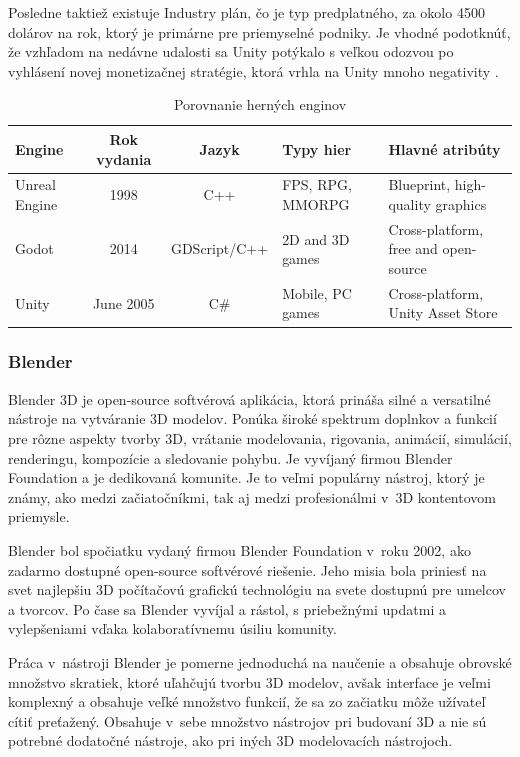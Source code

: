 Posledne taktiež existuje Industry plán, čo je typ predplatného, za okolo 4500 dolárov na rok, ktorý je primárne pre priemyselné podniky. Je vhodné podotknúť, že vzhľadom na nedávne udalosti sa Unity potýkalo s veľkou odozvou po vyhlásení novej monetizačnej stratégie, ktorá vrhla na Unity mnoho negativity \cite{lacoma2023unity}.%

\begin{table}[!h]
\centering
\caption{Porovnanie herných enginov}
\label{tab:game-engines}
\begin{tabularx}{\textwidth}{|l|c|c|X|X|}
\hline
\textbf{Engine} & \textbf{Rok vydania} & \textbf{Jazyk} & \textbf{Typy hier} & \textbf{Hlavné atribúty} \\ \hline
Unreal Engine & 1998 & C++ & FPS, RPG, MMORPG & Blueprint, high-quality graphics \\ \hline
Godot & 2014 & GDScript/C++ & 2D and 3D games & Cross-platform, free and open-source \\ \hline
Unity & June 2005 & C\# & Mobile, PC games & Cross-platform, Unity Asset Store \\ \hline
\end{tabularx}
\end{table}

\FloatBarrier 

\subsubsection{Blender}

Blender 3D je open-source softvérová aplikácia, ktorá prináša silné a versatilné nástroje na vytváranie 3D modelov. Ponúka široké spektrum doplnkov a funkcií pre rôzne aspekty tvorby 3D, vrátanie modelovania, rigovania, animácií, simulácií, renderingu, kompozície a sledovanie pohybu. Je vyvíjaný firmou Blender Foundation a je dedikovaná komunite. Je to veľmi populárny nástroj, ktorý je známy, ako medzi začiatočníkmi, tak aj medzi profesionálmi v~3D kontentovom priemysle. 

Blender bol spočiatku vydaný firmou Blender Foundation v~roku 2002, ako zadarmo dostupné open-source softvérové riešenie. Jeho misia bola priniesť na svet najlepšiu 3D počítačovú grafickú technológiu na svete dostupnú pre umelcov a tvorcov. Po čase sa Blender vyvíjal a rástol, s priebežnými updatmi a vylepšeniami vďaka kolaboratívnemu úsiliu komunity. 

Práca v~nástroji Blender je pomerne jednoduchá na naučenie a obsahuje obrovské množstvo skratiek, ktoré uľahčujú tvorbu 3D modelov, avšak interface je veľmi komplexný a obsahuje veľké množstvo funkcií, že sa zo začiatku môže užívateľ cítiť preťažený. Obsahuje v~sebe množstvo nástrojov pri budovaní 3D a nie sú potrebné dodatočné nástroje, ako pri iných 3D modelovacích nástrojoch. 

